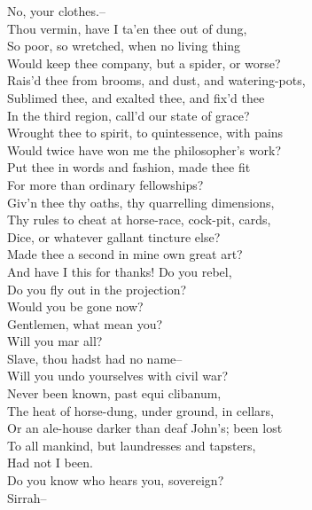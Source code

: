 \documentclass{memoir}
\begin{document}
\begin{drama*}
\subtlespeaks {} No, your clothes.--\\
 Thou vermin, have I ta'en thee out of dung,\\
 So poor, so wretched, when no living thing\\
 Would keep thee company, but a spider, or worse?\\
 Rais'd thee from brooms, and dust, and watering-pots,\\
 Sublimed thee, and exalted thee, and fix'd thee\\
 In the third region, call'd our state of grace?\\
 Wrought thee to spirit, to quintessence, with pains\\
 Would twice have won me the philosopher's work?\\
 Put thee in words and fashion, made thee fit\\
 For more than ordinary fellowships?\\
 Giv'n thee thy oaths, thy quarrelling dimensions,\\
 Thy rules to cheat at horse-race, cock-pit, cards,\\
 Dice, or whatever gallant tincture else?\\
 Made thee a second in mine own great art?\\
 And have I this for thanks! Do you rebel,\\
 Do you fly out in the projection?\\
 Would you be gone now?\\
\dolspeaks {} Gentlemen, what mean you?\\
 Will you mar all?\\
\subtlespeaks {} Slave, thou hadst had no name--\\
\dolspeaks  Will you undo yourselves with civil war?\\
\subtlespeaks  Never been known, past equi clibanum,\\
 The heat of horse-dung, under ground, in cellars,\\
 Or an ale-house darker than deaf John's; been lost\\
 To all mankind, but laundresses and tapsters,\\
 Had not I been.\\
\dolspeaks {} Do you know who hears you, sovereign?\\
\facespeaks  Sirrah--\\

\end{drama*}
\end{document}
